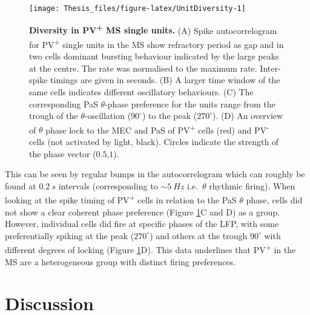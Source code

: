 \documentclass[
  12pt,
  a4paper,
  openany]{book}
\begin{document}
\begin{figure}[htb]

{\centering \texttt{[image: Thesis\_files/figure-latex/UnitDiversity-1]} 

}

\caption[Diversity in PV\textsuperscript{+} MS single units]{\textbf{Diversity in PV\textsuperscript{+} MS single units.} (A) Spike autocorrelogram for PV\textsuperscript{+} single units in the MS show refractory period as gap and in two cells dominant bursting behaviour indicated by the large peaks at the centre. The rate was normalised to the maximum rate. Inter-spike timings are given in seconds. (B) A larger time window of the same cells indicates different oscillatory behaviours. (C) The corresponding PaS \(\theta\)-phase preference for the units range from the trough of the \(\theta\)-oscillation (\(90^{\circ}\)) to the peak (\(270^{\circ}\)). (D) An overview of \(\theta\) phase lock to the MEC and PaS of PV\textsuperscript{+} cells (red) and PV\textsuperscript{-} cells (not activated by light, black). Circles indicate the strength of the phase vector (\(0.5\),\(1\)).}\label{fig:UnitDiversity}
\end{figure}

\noindent This can be seen by regular bumps in the autocorrelogram which can roughly be found at \(0.2\ s\) intervals (corresponding to \(\sim 5\ Hz\) i.e.~\(\theta\) rhythmic firing). When looking at the spike timing of PV\textsuperscript{+} cells in relation to the PaS \(\theta\) phase, cells did not show a clear coherent phase preference (Figure \ref{fig:UnitDiversity}C and D) as a group. However, individual cells did fire at specific phases of the LFP, with some preferentially spiking at the peak (\(270^{\circ}\)) and others at the trough \(90^{\circ}\) with different degrees of locking (Figure \ref{fig:UnitDiversity}D). This data underlines that PV\textsuperscript{+} in the MS are a heterogeneous group with distinct firing preferences.

\hypertarget{discussion}{%
\chapter{Discussion}\label{discussion}}
\end{document}
